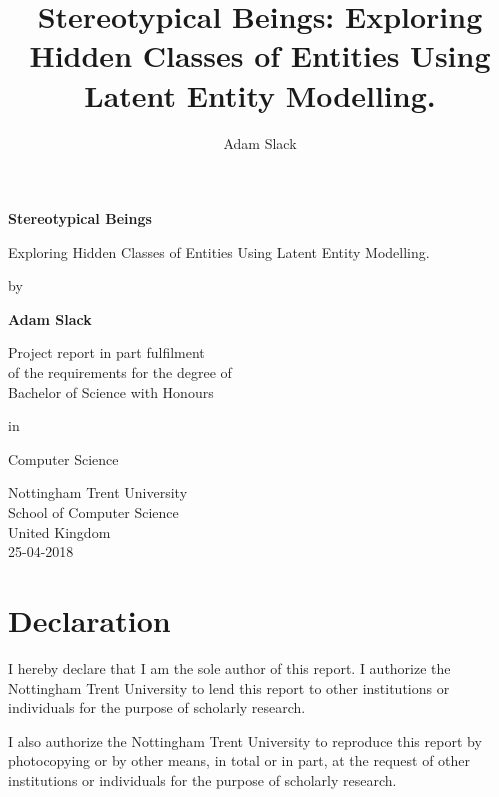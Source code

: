 \documentclass[10pt]{report}
\title{Stereotypical Beings: Exploring Hidden Classes of Entities Using Latent Entity Modelling.}
\author{Adam Slack}
\date{}
\begin{document}
 
\begin{titlepage}
    \begin{center}
        \vspace*{1cm}
        
        \Huge\textbf{Stereotypical Beings}
        
        \huge\vspace{0.5cm}
                Exploring Hidden Classes of Entities Using Latent Entity Modelling.
                \vspace{1.5cm}

                \large{by}

        \large\textbf{Adam Slack}

        \vfill
        
        \normalsize Project report in part fulfilment
        \\of the requirements for the degree of
        \\Bachelor of Science with Honours

        in

        Computer Science
        \vspace{0.8cm}
        
        
        Nottingham Trent University\\
        School of Computer Science\\
        United Kingdom\\
        25-04-2018
        
    \end{center}
\end{titlepage}

\section*{Declaration}

I hereby declare that I am the sole author of this report. I authorize the Nottingham Trent University to lend this report to other institutions or individuals for the purpose of scholarly research.

I also authorize the Nottingham Trent University to reproduce this report by photocopying or by other means, in total or in part, at the request of other institutions or individuals for the purpose of scholarly research.

\vspace{2cm}
\end{document}
